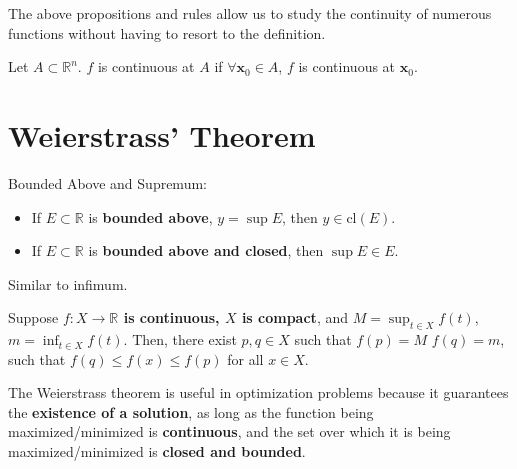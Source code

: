 \begin{remark*}
    The above propositions and rules allow us to study the continuity of numerous functions without having to resort to the definition.
\end{remark*}


\begin{definition}
    Let \(A\subset \mathbb{R}^{n}\). \(f\) is continuous at \(A\) if \(\forall \mathbf{x}_0\in A\), \(f\) is continuous at \(\mathbf{x}_0\).
\end{definition}

\section{Weierstrass' Theorem}

\begin{proposition} Bounded Above and Supremum:
    \begin{itemize}
        \item If \(E \subset \mathbb{R}\) is \textbf{bounded above}, \(y = \sup E\), then \(y \in \text{cl} (E)\).
        \item If \(E \subset \mathbb{R}\) is \textbf{bounded above and closed}, then \(\sup E \in E\).
    \end{itemize}
\end{proposition}

\begin{remark*}
    Similar to infimum.
\end{remark*}

\begin{theorem}
    Suppose \textbf{\(f:X\to \mathbb{R}\) is continuous, \(X\) is compact}, and \(M = \sup_{t\in X}f(t)\), \(m = \inf_{t\in X}f(t)\). Then, there exist \(p,q\in X\) such that \(f(p) = M\) \(f(q) = m\), such that \(f(q)\leq f(x)\leq f(p)\) for all \(x\in X\).
\end{theorem}

\begin{remark*}
      The Weierstrass theorem is useful in optimization problems because it guarantees the \textbf{existence of a solution}, as long as the function being maximized/minimized is \textbf{continuous}, and the set over which it is being maximized/minimized is \textbf{closed and bounded}.
\end{remark*}



